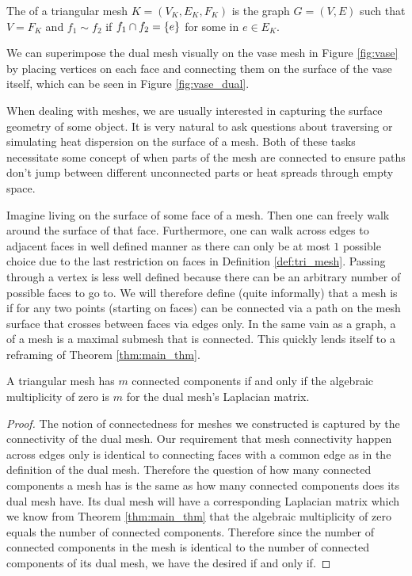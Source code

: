 \documentclass[11pt]{article}
\begin{document}
\begin{definition}
    The  of a triangular mesh $K = (V_K, E_K, F_K)$ is the graph $G = (V, E)$ such that $V = F_K$ and $f_1 \sim f_2$ if $f_1 \cap f_2 = \qty{e}$ for some in $e \in E_K$.
\end{definition}

\begin{example}
    We can superimpose the dual mesh visually on the vase mesh in Figure \ref{fig:vase} by placing vertices on each face and connecting them on the surface of the vase itself, which can be seen in Figure \ref{fig:vase_dual}.
\end{example}

When dealing with meshes, we are usually interested in capturing the surface geometry of some object. It is very natural to ask questions about traversing or simulating heat dispersion on the surface of a mesh. Both of these tasks necessitate some concept of when parts of the mesh are connected to ensure paths don't jump between different unconnected parts or heat spreads through empty space. 

Imagine living on the surface of some face of a mesh. Then one can freely walk around the surface of that face. Furthermore, one can walk across edges to adjacent faces in well defined manner as there can only be at most $1$ possible choice due to the last restriction on faces in Definition \ref{def:tri_mesh}. Passing through a vertex is less well defined because there can be an arbitrary number of possible faces to go to. We will therefore define (quite informally) that a mesh is  if for any two points (starting on faces) can be connected via a path on the mesh surface that crosses between faces via edges only. In the same vain as a graph, a  of a mesh is a maximal submesh that is connected. This quickly lends itself to a reframing of Theorem \ref{thm:main_thm}.

\begin{theorem}
    A triangular mesh has $m$ connected components if and only if the algebraic multiplicity of zero is $m$ for the dual mesh's Laplacian matrix.
\end{theorem}

\begin{proof}
    The notion of connectedness for meshes we constructed is captured by the connectivity of the dual mesh. Our requirement that mesh connectivity happen across edges only is identical to connecting faces with a common edge as in the definition of the dual mesh. Therefore the question of how many connected components a mesh has is the same as how many connected components does its dual mesh have. Its dual mesh will have a corresponding Laplacian matrix which we know from Theorem \ref{thm:main_thm} that the algebraic multiplicity of zero equals the number of connected components. Therefore since the number of connected components in the mesh is identical to the number of connected components of its dual mesh, we have the desired if and only if.
\end{proof}
\end{document}
